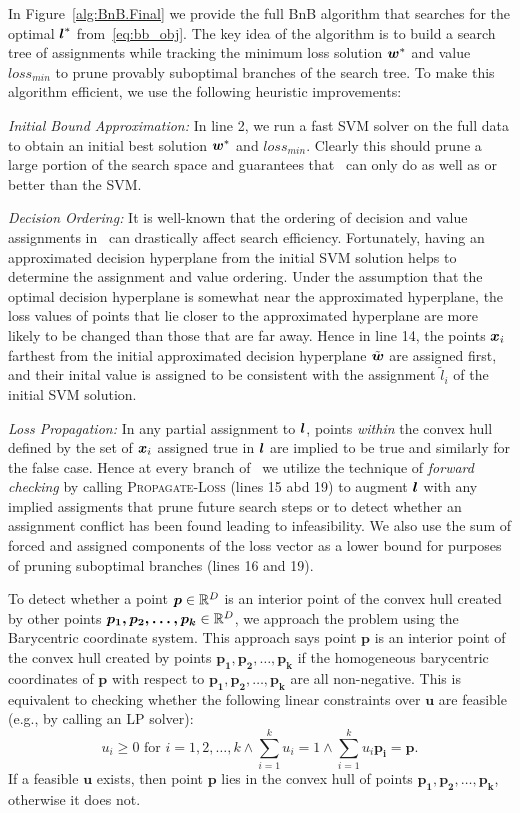 In Figure~\ref{alg:BnB.Final} we provide the full BnB algorithm that
searches for the optimal $\boldsymbol{l}^*$ from~\eqref{eq:bb_obj}.  The key idea
of the algorithm is to build a search tree of assignments while
tracking the minimum loss solution $\boldsymbol{w}^*$ and value $loss_{min}$ to
prune provably suboptimal branches of the search tree.  To make this
algorithm efficient, we use the following heuristic improvements:

\noindent \emph{Initial Bound Approximation:} In line 2, we run a fast
SVM solver on the full data to obtain an initial best solution $\boldsymbol{w}^*$
and $loss_{min}$.  Clearly this should prune a large portion of the
search space and guarantees that \BB\ can only do as well as or better
than the SVM.

\noindent \emph{Decision Ordering:} It is well-known that the ordering
of decision and value assignments in \BB\ can drastically affect
search efficiency.  Fortunately, having an approximated decision
hyperplane from the initial SVM solution helps to determine the
assignment and value ordering. Under the assumption that the optimal
decision hyperplane is somewhat near the approximated hyperplane, the
loss values of points that lie closer to the approximated hyperplane
are more likely to be changed than those that are far away.  Hence in
line 14, the points $\boldsymbol{x}_i$ farthest from the initial approximated
decision hyperplane $\tilde{\boldsymbol{w}}$ are assigned first, and their inital
value is assigned to be consistent with the assignment $\tilde{l}_i$
of the initial SVM solution.

\noindent \emph{Loss Propagation:} In any partial assignment to $\boldsymbol{l}$,
points \emph{within} the convex hull defined by the set of $\boldsymbol{x}_i$
assigned true in $\boldsymbol{l}$ are implied to be true and similarly for the
false case.  Hence at every branch of \BB\ we utilize the technique of
\emph{forward checking} by calling \textsc{Propagate-Loss} (lines 15
abd 19) to augment $\boldsymbol{l}$ with any implied assigments that prune future
search steps or to detect whether an assignment conflict has been
found leading to infeasibility.  We also use the sum of forced and
assigned components of the loss vector as a lower bound for purposes
of pruning suboptimal branches (lines 16 and 19).

To detect whether a point $\boldsymbol{p} \in \mathbb{R}^D$ is an interior
point of the convex hull created by other points $\boldsymbol{p_1,
  p_2, \dots, p_k} \in \mathbb{R}^D$, we approach the problem using the
Barycentric coordinate system.  This approach says point
$\boldsymbol{p}$ is an interior point of the convex hull created by
points $\boldsymbol{p_1, p_2, \dots, p_k}$ if the homogeneous
barycentric coordinates of $\boldsymbol{p}$ with respect to
$\boldsymbol{p_1, p_2, \dots, p_k}$ are all non-negative. This is
equivalent to checking whether the following linear constraints
over $\boldsymbol{u}$ are feasible (e.g., by calling an LP solver):
$$
u_i \geq 0 \text{ for } i = 1,2, \dots, k \land \sum_{i=1}^k u_i = 1 \land \sum_{i=1}^k u_i \boldsymbol{p_i} = \boldsymbol{p}. 
$$ If a feasible $\boldsymbol{u}$ exists, then point $\boldsymbol{p}$ lies
in the convex hull of points $\boldsymbol{p_1, p_2, \dots, p_k}$,
otherwise it does not.

